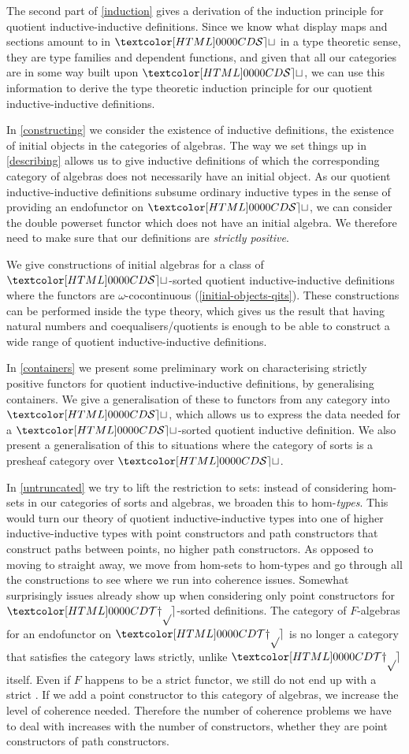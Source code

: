 The second part of \cref{induction} gives a derivation of the
induction principle for quotient inductive-inductive
definitions. Since we know what display maps and sections amount to in
$\SET$ in a type theoretic sense, \ie they are type families and
dependent functions, and given that all our categories are in some way
built upon $\SET$, we can use this information to derive the type
theoretic induction principle for our quotient inductive-inductive
definitions.

In \cref{constructing} we consider the existence of inductive
definitions, \ie the existence of initial objects in the categories of
algebras. The way we set things up in \cref{describing} allows us to
give inductive definitions of which the corresponding category of
algebras does not necessarily have an initial object. As our quotient
inductive-inductive definitions subsume ordinary inductive types in
the sense of providing an endofunctor on $\SET$, we can consider the
double powerset functor which does not have an initial algebra. We
therefore need to make sure that our definitions are \emph{strictly
  positive}. 

We give constructions of initial algebras for a class of $\SET$-sorted
quotient inductive-inductive definitions where the functors are
$\omega$-cocontinuous (\cref{initial-objects-qits}). These
constructions can be performed inside the type theory, which gives us
the result that having natural numbers and coequalisers/quotients is
enough to be able to construct a wide range of quotient
inductive-inductive definitions.

In \cref{containers} we present some preliminary work on
characterising strictly positive functors for quotient
inductive-inductive definitions, by generalising containers. We give a
generalisation of these to functors from any category into $\SET$,
which allows us to express the data needed for a $\SET$-sorted
quotient inductive definition. We also present a generalisation of
this to situations where the category of sorts is a presheaf category
over $\SET$.

In \cref{untruncated} we try to lift the restriction to sets: instead
of considering hom-sets in our categories of sorts and algebras, we
broaden this to hom-\emph{types}. This would turn our theory of
quotient inductive-inductive types into one of higher
inductive-inductive types with point constructors and path
constructors that construct paths between points, \ie no higher path
constructors. As opposed to moving to \inftycats straight away, we
move from hom-sets to hom-types and go through all the constructions
to see where we run into coherence issues. Somewhat surprisingly
issues already show up when considering only point constructors for
$\TYPE$-sorted definitions. The category of $F$-algebras for an
endofunctor on $\TYPE$ is no longer a category that satisfies the
category laws strictly, unlike $\TYPE$ itself. Even if $F$ happens to
be a strict functor, we still do not end up with a strict
\inftycat. If we add a point constructor to this category of algebras,
we increase the level of coherence needed. Therefore the number of
coherence problems we have to deal with increases with the number of
constructors, whether they are point constructors of path
constructors.

